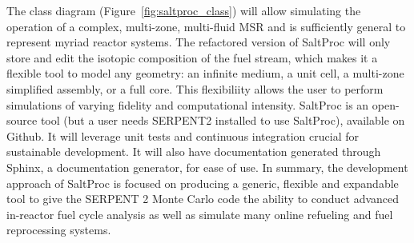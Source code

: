 The class diagram (Figure~\ref{fig:saltproc_class}) will allow simulating 
the operation of a complex, multi-zone, 
multi-fluid \gls{MSR} and is sufficiently general to represent myriad reactor 
systems. The refactored version of SaltProc will only store and edit the 
isotopic composition of the fuel stream, which makes it a flexible tool to 
model any geometry: an infinite medium, a unit cell, a multi-zone simplified 
assembly, or a full core. This flexibiliity allows the user to perform 
simulations of varying fidelity and computational intensity. SaltProc is an 
open-source tool (but a user needs SERPENT2 installed to use SaltProc), 
available on Github. It will leverage unit tests and continuous integration 
crucial for sustainable development. It will also have documentation
generated through Sphinx, a documentation generator, for ease of use. In summary, the 
development approach of SaltProc is focused on producing a generic, flexible and 
expandable tool to give the SERPENT 2 Monte Carlo code the ability to conduct 
advanced in-reactor fuel cycle analysis as well as simulate many 
online refueling and fuel reprocessing systems.


